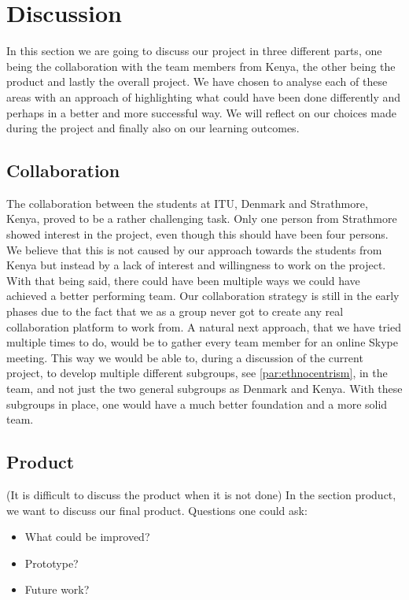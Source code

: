 \section{Discussion}\label{sec:discussion}
In this section we are going to discuss our project in three different parts, one being the collaboration with the team members from Kenya, the other being the product and lastly the overall project. We have chosen to analyse each of these areas with an approach of highlighting what could have been done differently and perhaps in a better and more successful way. We will reflect on our choices made during the project and finally also on our learning outcomes.

\subsection{Collaboration}\label{subsec:collaboration}
The collaboration between the students at ITU, Denmark and Strathmore, Kenya, proved to be a rather challenging task. Only one person from Strathmore showed interest in the project, even though this should have been four persons. We believe that this is not caused by our approach towards the students from Kenya but instead by a lack of interest and willingness to work on the project.
With that being said, there could have been multiple ways we could have achieved a better performing team. Our collaboration strategy is still in the early phases due to the fact that we as a group never got to create any real collaboration platform to work from. 
A natural next approach, that we have tried multiple times to do, would be to gather every team member for an online Skype meeting. This way we would be able to, during a discussion of the current project, to develop multiple different subgroups, see \ref{par:ethnocentrism}, in the team, and not just the two general subgroups as Denmark and Kenya. With these subgroups in place, one would have a much better foundation and a more solid team.

\subsection{Product}\label{subsec:product}
(It is difficult to discuss the product when it is not done)
In the section product, we want to discuss our final product. Questions one could ask:

\begin{itemize}
	\item What could be improved?
	\item Prototype?
	\item Future work?
\end{itemize}


